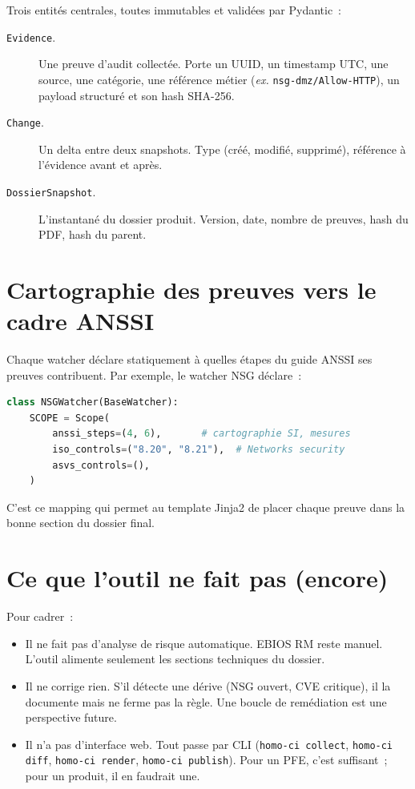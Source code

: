 Trois entités centrales, toutes immutables et validées par
Pydantic~:

\begin{description}
  \item[\texttt{Evidence}.] Une preuve d'audit collectée. Porte
    un UUID, un timestamp UTC, une source, une catégorie, une
    référence métier (\emph{ex.} \texttt{nsg-dmz/Allow-HTTP}),
    un payload structuré et son hash SHA-256.
  \item[\texttt{Change}.] Un delta entre deux snapshots. Type
    (créé, modifié, supprimé), référence à l'évidence avant et
    après.
  \item[\texttt{DossierSnapshot}.] L'instantané du dossier
    produit. Version, date, nombre de preuves, hash du PDF,
    hash du parent.
\end{description}

\section{Cartographie des preuves vers le cadre ANSSI}

Chaque watcher déclare statiquement à quelles étapes du guide
ANSSI ses preuves contribuent. Par exemple, le watcher NSG
déclare~:

\begin{lstlisting}[language=Python,caption={Mapping NSG vers le
référentiel ANSSI / ISO.}]
class NSGWatcher(BaseWatcher):
    SCOPE = Scope(
        anssi_steps=(4, 6),       # cartographie SI, mesures
        iso_controls=("8.20", "8.21"),  # Networks security
        asvs_controls=(),
    )
\end{lstlisting}

C'est ce mapping qui permet au template Jinja2 de placer chaque
preuve dans la bonne section du dossier final.

\section{Ce que l'outil ne fait pas (encore)}

Pour cadrer~:

\begin{itemize}
  \item Il ne fait pas d'analyse de risque automatique. EBIOS RM
    reste manuel. L'outil alimente seulement les sections
    techniques du dossier.
  \item Il ne corrige rien. S'il détecte une dérive (NSG ouvert,
    CVE critique), il la documente mais ne ferme pas la règle.
    Une boucle de remédiation est une perspective future.
  \item Il n'a pas d'interface web. Tout passe par CLI
    (\texttt{homo-ci collect}, \texttt{homo-ci diff},
    \texttt{homo-ci render}, \texttt{homo-ci publish}). Pour un
    PFE, c'est suffisant~; pour un produit, il en faudrait une.
\end{itemize}
